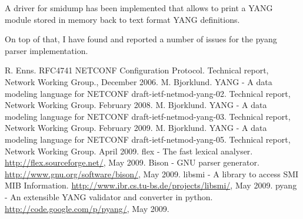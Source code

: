 \documentclass[conference]{IEEEtran}
\begin{document}
A driver for smidump has been implemented that allows to print a YANG module stored in memory back to text format YANG definitions.

On top of that, I have found and reported  a number of issues for the pyang parser implementation.  

\begin{thebibliography}{1}
 R. Enns. RFC4741 NETCONF Configuration Protocol. Technical report, Network Working Group.,
December 2006.
 M. Bjorklund. YANG - A data modeling language for NETCONF draft-ietf-netmod-yang-02. Technical report, Network Working Group. February 2008.
 M. Bjorklund. YANG - A data modeling language for NETCONF draft-ietf-netmod-yang-03. Technical report, Network Working Group. February 2009.
 M. Bjorklund. YANG - A data modeling language for NETCONF draft-ietf-netmod-yang-05. Technical report, Network Working Group. April 2009.
 flex - The fast lexical analyser. \url{http://flex.sourceforge.net/}, May 2009.
 Bison - GNU parser generator. \url{http://www.gnu.org/software/bison/}, May 2009.
 libsmi - A library to access SMI MIB Information. \url{http://www.ibr.cs.tu-bs.de/projects/libsmi/}, May 2009.
 pyang - An extensible YANG validator and converter in python. \url{http://code.google.com/p/pyang/}, May 2009.

\end{thebibliography}
\end{document}
